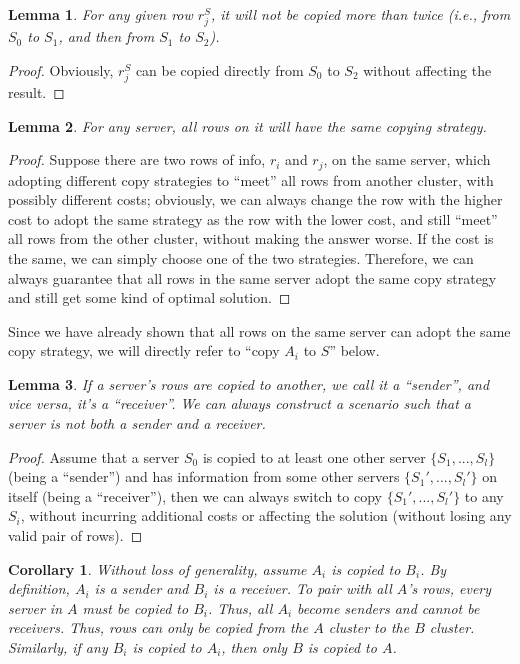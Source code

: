 \documentclass[11pt, a4paper, oneside]{memoir}
\newtheorem{lemma}{Lemma}
\newtheorem{corollary}{Corollary}
\begin{document}
\begin{lemma}
  For any given row $r^S_j$, it will not be copied more than twice
  (i.e., from $S_0$ to $S_1$, and then from $S_1$ to $S_2$).
\end{lemma}
\begin{proof}
  Obviously, $r^S_j$ can be copied directly from $S_0$ to $S_2$ without affecting the result.
\end{proof}

\begin{lemma}
  For any server, all rows on it will have the same copying strategy.
\end{lemma}
\begin{proof}
  Suppose there are two rows of info, $r_i$ and $r_j$, on the same server,
  which adopting different copy strategies to ``meet'' all rows from another cluster,
  with possibly different costs; obviously, we can always change the row with the higher cost
  to adopt the same strategy as the row with the lower cost,
  and still ``meet'' all rows from the other cluster, without making the answer worse.
  If the cost is the same, we can simply choose one of the two strategies.
  Therefore, we can always guarantee that all rows in the same server adopt the same copy strategy
  and still get some kind of optimal solution.
\end{proof}

Since we have already shown that all rows on the same server can adopt the same copy strategy,
we will directly refer to ``copy $A_i$ to $S$'' below.

\begin{lemma}
  If a server's rows are copied to another, we call it a ``sender'', and vice versa, it's a ``receiver''.
  We can always construct a scenario such that a server is not both a sender and a receiver.
\end{lemma}
\begin{proof}
  Assume that a server $S_0$ is copied to at least one other server $\{S_1, ..., S_l\}$ (being a ``sender'')
  and has information from some other servers $\{S_1', ..., S_l'\}$ on itself (being a ``receiver''),
  then we can always switch to copy $\{S_1', ..., S_l'\}$ to any $S_i$,
  without incurring additional costs or affecting the solution (without losing any valid pair of rows).
\end{proof}

\begin{corollary}
  Without loss of generality, assume $A_i$ is copied to $B_i$. By definition, $A_i$ is a sender and $B_i$ is a receiver.
  To pair with all $A$'s rows, every server in $A$ must be copied to $B_i$.
  Thus, all $A_i$ become senders and cannot be receivers.
  Thus, rows can only be copied from the $A$ cluster to the $B$ cluster.
  Similarly, if any $B_i$ is copied to $A_i$, then only $B$ is copied to $A$.
\end{corollary}
\end{document}

